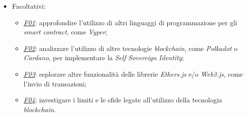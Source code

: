 \begin{itemize}
    \item Facoltativi:
        \begin{itemize}
            \item \underline{\textit{F01}}: approfondire l'utilizzo di altri linguaggi di programmazione per gli \textit{smart contract}, come \textit{Vyper};
            \item \underline{\textit{F02}}: analizzare l'utilizzo di altre tecnologie \textit{blockchain}, come \textit{Polkadot} o \textit{Cardano}, per implementare la \textit{Self Sovereign Identity};
            \item \underline{\textit{F03}}: esplorare altre funzionalità delle librerie \textit{Ethers.js} e/o \textit{Web3.js}, come l'invio di transazioni;
            \item \underline{\textit{F04}}: investigare i limiti e le sfide legate all'utilizzo della tecnologia \textit{blockchain}.
        \end{itemize}
    
\end{itemize}